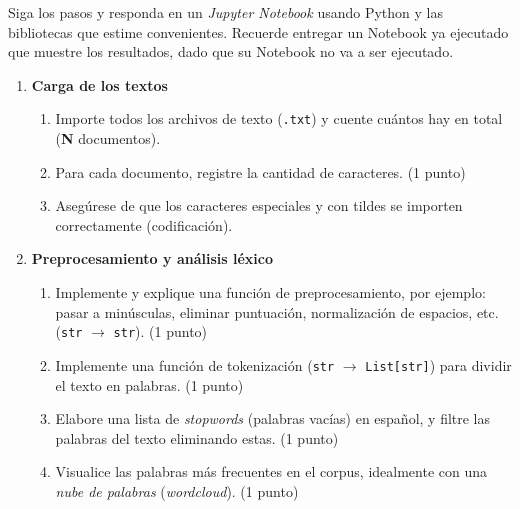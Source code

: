 \documentclass{article}
\begin{document}
Siga los pasos y responda en un \emph{Jupyter Notebook} usando Python y las bibliotecas que estime convenientes. Recuerde entregar un Notebook ya ejecutado que muestre los resultados, dado que su Notebook no va a ser ejecutado.

\begin{enumerate}

  \item \textbf{Carga de los textos}
    \begin{enumerate}
        \item Importe todos los archivos de texto (\texttt{.txt}) y cuente cuántos hay en total (\textbf{N} documentos).
        \item Para cada documento, registre la cantidad de caracteres. (1 punto)
        \item Asegúrese de que los caracteres especiales y con tildes se importen correctamente (codificación).
    \end{enumerate}

  \item \textbf{Preprocesamiento y análisis léxico}
    \begin{enumerate}
        \item Implemente y explique una función de preprocesamiento, por ejemplo: pasar a minúsculas, eliminar puntuación, normalización de espacios, etc. (\texttt{str} $\rightarrow$ \texttt{str}). (1 punto)
        \item Implemente una función de tokenización (\texttt{str} $\rightarrow$ \texttt{List[str]}) para dividir el texto en palabras. (1 punto)
        \item Elabore una lista de \emph{stopwords} (palabras vacías) en español, y filtre las palabras del texto eliminando estas. (1 punto)
        \item Visualice las palabras más frecuentes en el corpus, idealmente con una \textit{nube de palabras} (\emph{wordcloud}). (1 punto)
    \end{enumerate}


\end{enumerate}
\end{document}
